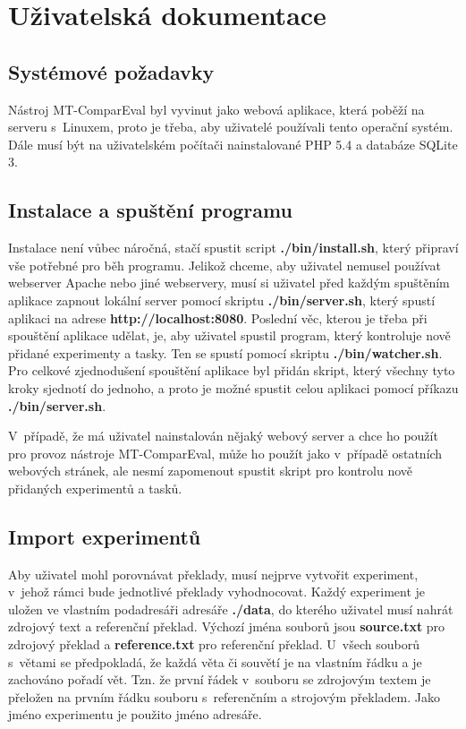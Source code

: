 \chapter{Uživatelská dokumentace}
\label{chap:users}

\section{Systémové požadavky}
Nástroj MT-ComparEval byl vyvinut jako webová aplikace,
  která poběží na serveru s~Linuxem,
  proto je třeba,
  aby uživatelé používali tento operační systém.
Dále musí být na uživatelském počítači nainstalované PHP 5.4 a databáze SQLite 3.

\section{Instalace a spuštění programu}
Instalace není vůbec náročná,
  stačí spustit script \textbf{./bin/install.sh},
  který připraví vše potřebné pro běh programu. 
Jelikož chceme,
  aby uživatel nemusel používat webserver Apache nebo jiné webservery,
  musí si uživatel před každým spuštěním aplikace zapnout lokální server pomocí skriptu \textbf{./bin/server.sh},
  který spustí aplikaci na adrese \textbf{http://localhost:8080}.
Poslední věc,
  kterou je třeba při spouštění aplikace udělat, je,
  aby uživatel spustil program,
  který kontroluje nově přidané experimenty a tasky.
Ten se spustí pomocí skriptu \textbf{./bin/watcher.sh}.
Pro celkové zjednodušení spouštění aplikace byl přidán skript,
  který všechny tyto kroky sjednotí do jednoho,
  a proto je možné spustit celou aplikaci pomocí příkazu \textbf{./bin/server.sh}.

V~případě, že má uživatel nainstalován nějaký webový server
  a chce ho použít pro provoz nástroje MT-ComparEval,
  může ho použít jako v~případě ostatních webových stránek,
  ale nesmí zapomenout spustit skript pro kontrolu nově přidaných experimentů a tasků.

\section{Import experimentů}
Aby uživatel mohl porovnávat překlady,
  musí nejprve vytvořit experiment,
  v~jehož rámci bude jednotlivé překlady vyhodnocovat.
Každý experiment je uložen ve vlastním podadresáři adresáře \textbf{./data},
  do kterého uživatel musí nahrát zdrojový text a referenční překlad.
Výchozí jména souborů jsou \textbf{source.txt} pro zdrojový překlad
  a \textbf{reference.txt} pro referenční překlad.
U~všech souborů s~větami se předpokladá,
  že každá věta či souvětí je na vlastním řádku
  a je zachováno pořadí vět.
Tzn. že první řádek v~souboru se zdrojovým textem je přeložen na prvním řádku souboru s~referenčním a strojovým překladem.
Jako jméno experimentu je použito jméno adresáře.

